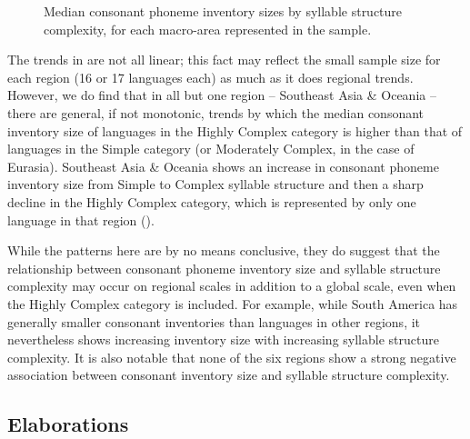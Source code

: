 \begin{figure}
\caption{\label{fig:4.3} Median consonant phoneme inventory sizes by syllable structure complexity, for each macro-area represented in the sample.}
\end{figure}

  The trends in  are not all linear; this fact may reflect the small sample size for each region (16 or 17 languages each) as much as it does regional trends. However, we do find that in all but one region -- Southeast Asia \& Oceania -- there are general, if not monotonic, trends by which the median consonant inventory size of languages in the Highly Complex category is higher than that of languages in the Simple category (or Moderately Complex, in the case of Eurasia). Southeast Asia \& Oceania shows an increase in consonant phoneme inventory size from Simple to Complex syllable structure and then a sharp decline in the Highly Complex category, which is represented by only one language in that region ().

  While the patterns here are by no means conclusive, they do suggest that the relationship between consonant phoneme inventory size and syllable structure complexity may occur on regional scales in addition to a global scale, even when the Highly Complex category is included. For example, while South America has generally smaller consonant inventories than languages in other regions, it nevertheless shows increasing inventory size with increasing syllable structure complexity. It is also notable that none of the six regions show a strong negative association between consonant inventory size and syllable structure complexity.

\subsection{Elaborations}\label{sec:4.4.2}

